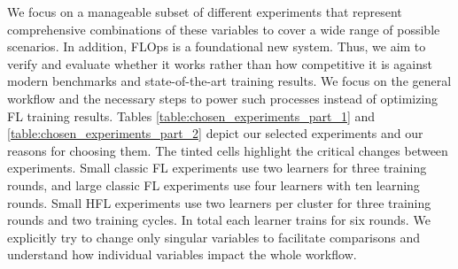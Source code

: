We focus on a manageable subset of different experiments that represent comprehensive combinations of these variables to cover a wide range of possible scenarios.
In addition, FLOps is a foundational new system.
Thus, we aim to verify and evaluate whether it works rather than how competitive it is against modern benchmarks and state-of-the-art training results.
We focus on the general workflow and the necessary steps to power such processes instead of optimizing FL training results.
Tables \ref{table:chosen_experiments_part_1} and \ref{table:chosen_experiments_part_2} depict our selected experiments and our reasons for choosing them.
The tinted cells highlight the critical changes between experiments.
Small classic FL experiments use two learners for three training rounds, and large classic FL experiments use four learners with ten learning rounds.
Small HFL experiments use two learners per cluster for three training rounds and two training cycles.
In total each learner trains for six rounds.
We explicitly try to change only singular variables to facilitate comparisons and understand how individual variables impact the whole workflow.

\begin{figure}[p]
    
\end{figure}

\begin{figure}[p]
    
\end{figure}